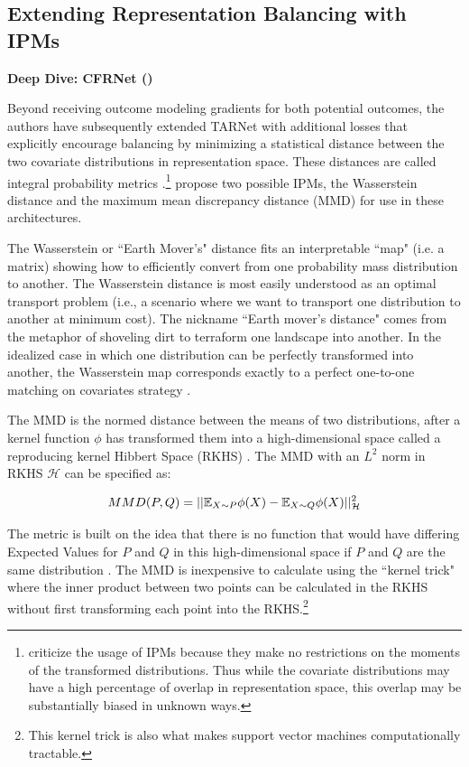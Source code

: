 \subsection{Extending Representation Balancing with IPMs}
\textbf{Deep Dive: CFRNet (\citet{Shalit2017,Johansson2018,johannson2020})}

Beyond receiving outcome modeling gradients for both potential outcomes, the authors have subsequently extended TARNet with additional losses that  explicitly encourage balancing by minimizing a statistical distance between the two covariate distributions in representation space. These distances are called integral probability metrics \citep{muller1997integral}.\footnote{\citet{zhang2020learning} criticize the usage of IPMs because they make no restrictions on the moments of the transformed distributions. Thus while the covariate distributions may have a high percentage of overlap in representation space, this overlap may be substantially biased in unknown ways.} \citet{Johansson2016,Shalit2017,Johansson2018} propose two possible IPMs, the Wasserstein distance and the maximum mean discrepancy distance (MMD) for use in these architectures. 

The Wasserstein or ``Earth Mover's" distance fits an interpretable ``map" (i.e. a matrix) showing how to efficiently convert from one probability mass distribution to another.  The Wasserstein distance is most easily understood as an optimal transport problem (i.e., a scenario where we want to transport one distribution to another at minimum cost). The nickname ``Earth mover's distance" comes from the metaphor of shoveling dirt to terraform one landscape into another. In the idealized case in which one distribution can be perfectly transformed into another, the Wasserstein map corresponds exactly to a perfect one-to-one matching on covariates strategy \citep{kallus2016generalized}.

The MMD is the normed distance between the means of two distributions, after a kernel function $\phi$ has transformed them into a high-dimensional space called a reproducing kernel Hibbert Space (RKHS) \citep{gretton2012kernel}. The MMD with an $L^2$ norm in RKHS $\mathcal{H}$ can be specified as:

\begin{equation}
MMD(P,Q) = ||\mathbb{E}_{X \sim P}\phi(X) - \mathbb{E}_{X \sim Q}\phi(X)||^2_{\mathcal{H}}
\end{equation}

The metric is built on the idea that there is no function that would have differing Expected Values for $P$ and $Q$ in this high-dimensional space if $P$ and $Q$ are the same distribution \citep{huszarblog}. The MMD is inexpensive to calculate using the ``kernel trick" where the inner product between two points can be calculated in the RKHS without first transforming each point into the RKHS.\footnote{This kernel trick is  also what makes support vector machines computationally tractable.} 


